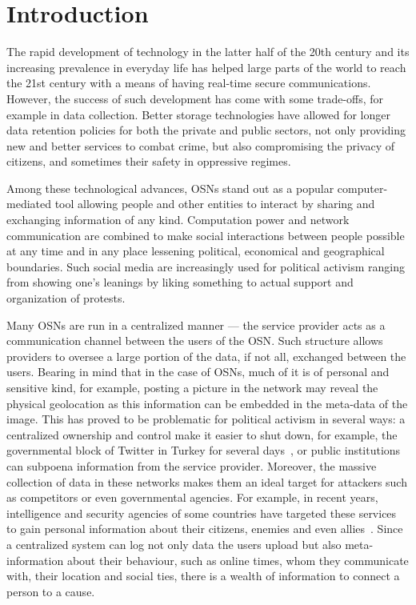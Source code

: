 \section{Introduction}
\label{Introduction}
The rapid development of technology in the latter half of the
20th century and its increasing prevalence in
everyday life has helped large parts of the world to reach the
21st century with a means of having real-time secure
communications.  However, the success of such development has come
with some trade-offs, for example in data collection. Better storage
technologies have allowed for longer data retention policies for both
the private and public sectors, not only providing new and better
services to combat crime, but also compromising the privacy of
citizens, and sometimes their safety in oppressive regimes.

Among these technological advances, \acp{OSN} stand out as a popular
computer-mediated tool allowing people and other entities to interact
by sharing and exchanging information of any kind. Computation power
and network communication are combined to make social interactions
between people possible at any time and in any place lessening
political, economical and geographical boundaries. Such social media
are increasingly used for political activism ranging from showing
one's leanings by liking something to actual support and organization
of protests.

Many \acp{OSN} are run in a centralized manner --- the service
provider acts as a communication channel between the users of the
\ac{OSN}. Such structure allows providers to oversee a large portion
of the data, if not all, exchanged between the users. Bearing in mind
that in the case of \acp{OSN}, much of it is of personal and sensitive
kind, for example, posting a picture in the network may reveal the
physical geolocation as this information can be embedded in the
meta-data of the image. This has proved to be problematic for
political activism in several ways: a centralized ownership and
control make it easier to shut down, for example, the governmental block of Twitter in
Turkey for several days~\cite{TurkeyBansTwitter}, or public institutions
can subpoena information from the service provider. Moreover, the massive
collection of data in these networks makes them an ideal target for
attackers such as competitors or even governmental agencies. For
example, in recent years, intelligence and security agencies of
some countries have targeted these services to gain personal
information about their citizens, enemies and even
allies~\cite{Prism}. Since a centralized system can log not only data
the users upload but also meta-information about their behaviour, such
as online times, whom they communicate with, their location and social
ties, there is a wealth of information to connect a person to a cause.

